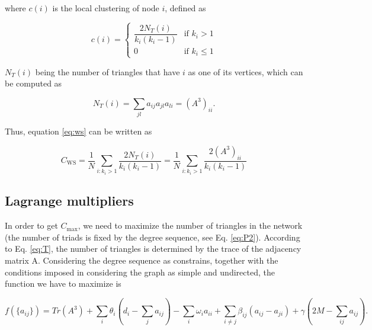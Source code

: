 \documentclass{article}
\begin{document}
where $c(i)$ is the local clustering of node $i$, defined as

\begin{equation}
    c(i) = 
    \left\{
    	\begin{array}{ll}
    		\dfrac{2 N_{T}(i)}{k_i (k_i-1)}  & \mbox{if } k_i > 1 \\
    		0 & \mbox{if } k_i \leq 1
    	\end{array}
    \right.
\end{equation}


$N_T(i)$ being the number of triangles that have $i$ as one of its vertices, which can be computed as

\begin{equation}
    N_T(i) = \sum_{jl} a_{ij} a_{jl} a_{li} = (A^3)_{ii}.
\end{equation}

Thus, equation \ref{eq:ws} can be written as

\begin{equation} \label{eq:Cws}
    C_{\mathrm{WS}} = \dfrac{1}{N} \sum\limits_{i:k_i>1}  \dfrac{2 N_{T}(i)}{k_i (k_i-1)} =  \dfrac{1}{N} \sum\limits_{i:k_i>1} \dfrac{2 (A^3)_{ii}}{k_i (k_i-1)} 
\end{equation}


\subsection{Lagrange multipliers}

In order to get $C_{\mathrm{max}}$, we need to maximize the number of triangles in the network (the number of triads is fixed by the degree sequence, see Eq. \ref{eq:P2}). According to Eq. \ref{eq:T}, the number of triangles is determined by the trace of the adjacency matrix A. Considering the degree sequence as constrains, together with the conditions imposed in considering the graph as simple and undirected, the function we have to maximize is

\begin{equation}
    f(\lbrace a_{ij} \rbrace) = Tr(A^3) + \sum_i \theta_i \left(d_i - \sum_j a_{ij} \right) - \sum_i \omega_i a_{ii} + \sum_{i\neq j} \beta_{ij} (a_{ij}-a_{ji}) + \gamma \left(2M - \sum_{ij} a_{ij} \right).
\end{equation}
\end{document}
